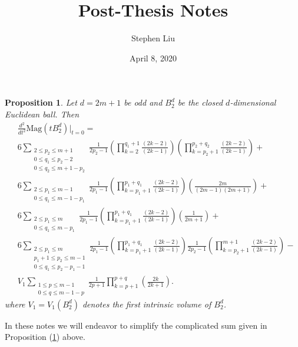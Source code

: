 \documentclass[11pt]{article}
\theoremstyle{definition}
\theoremstyle{definition}
\theoremstyle{plain}
\theoremstyle{plain}
\newtheorem{prop}{Proposition}
\theoremstyle{plain}
\theoremstyle{definition}
\theoremstyle{definition}
\begin{document}
\author{Stephen Liu}
\title{Post-Thesis Notes}
\date{April 8, 2020}

\maketitle

\begin{prop}\label{prop:partialres}
Let $d = 2m+1$ be odd and $B_2^d$ be the closed $d$-dimensional Euclidean ball. Then
\begin{equation}\label{eqn:partialres}
\begin{aligned}
&\frac{d^2}{dt^2}\text{Mag}(tB_2^d)\big\vert_{t=0} = \\
&6\sum\limits_{\substack{2\leq p_2\leq m+1 \\ 0\leq q_1 \leq p_2-2 \\ 0\leq q_2 \leq m+1-p_2}}\frac{1}{2p_2-1}\left(\prod\limits_{k=2}^{q_1+1}\frac{(2k-2)}{(2k-1)}\right)\left(\prod\limits_{k=p_2+1}^{p_2+q_2}\frac{(2k-2)}{(2k-1)}\right) + \\
&6\sum\limits_{\substack{2\leq p_1\leq m-1 \\ 0\leq q_1\leq m-1-p_1}}\frac{1}{2p_1-1}\left(\prod\limits_{k=p_1+1}^{p_1+q_1}\frac{(2k-2)}{(2k-1)}\right)\left(\frac{2m}{(2m-1)(2m+1)}\right) + \\
&6\sum\limits_{\substack{2\leq p_1\leq m \\ 0\leq q_1\leq m-p_1}}\frac{1}{2p_1-1}\left(\prod\limits_{k=p_1+1}^{p_1+q_1}\frac{(2k-2)}{(2k-1)}\right)\left(\frac{1}{2m+1}\right) + \\
&6\sum\limits_{\substack{2\leq p_1\leq m \\ p_1+1\leq p_2 \leq m-1 \\ 0\leq q_1\leq p_2-p_1-1 }}\frac{1}{2p_1-1}\left(\prod\limits_{k=p_1+1}^{p_1+q_1}\frac{(2k-2)}{(2k-1)}\right)\frac{1}{2p_2-1}\left(\prod\limits_{k=p_2+1}^{m+1}\frac{(2k-2)}{(2k-1)}\right) - \\
&V_{1}\sum\limits_{\substack{1\leq p \leq m-1 \\ 0 \leq q \leq m - 1 - p}}\frac{1}{2p+1}\prod\limits_{k=p+1}^{p+q}\left(\frac{2k}{2k+1}\right).
\end{aligned}
\end{equation}
where $V_1 = V_1\left(B_2^d\right)$ denotes the first intrinsic volume of $B_2^d$.
\end{prop}

In these notes we will endeavor to simplify the complicated sum given in Proposition (\ref{prop:partialres}) above.
\end{document}
